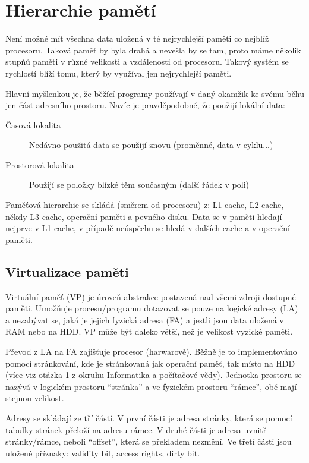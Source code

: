 \documentclass[10pt,a4paper,openright]{article}
\begin{document}
\section{Hierarchie pamětí}
Není možné mít všechna data uložená v té nejrychlejší paměti co nejblíž procesoru. Taková paměť by byla drahá a nevešla by se tam, proto máme několik stupňů paměti v různé velikosti a vzdálenosti od procesoru. Takový systém se rychlostí blíží tomu, který by využíval jen nejrychlejší paměti.

Hlavní myšlenkou je, že běžící programy používají v daný okamžik ke svému běhu jen část adresního prostoru. Navíc je pravděpodobné, že použijí lokální data: 

\begin{description}
\item[Časová lokalita] Nedávno použitá data se použijí znovu (proměnné, data v cyklu...)
\item[Prostorová lokalita] Použijí se položky blízké těm současným (další řádek v poli)
\end{description}

Paměťová hierarchie se skládá (směrem od procesoru) z: L1 cache, L2 cache, někdy L3 cache, operační paměti a pevného disku. Data se v paměti hledají nejprve v L1 cache, v případě neúspěchu se hledá v dalších cache a v operační paměti.

\subsection{Virtualizace paměti}
Virtuální paměť (VP) je úroveň abstrakce postavená nad všemi zdroji dostupné paměti. Umožňuje procesu/programu dotazovat se pouze na logické adresy (LA) a nezabývat se, jaká je jejich fyzická adresa (FA) a jestli jsou data uložená v RAM nebo na HDD. VP může být daleko větší, než je velikost vyzické paměti.

Převod z LA na FA zajišťuje procesor (harwarově). Běžně je to implementováno pomocí stránkování, kde je stránkovaná jak operační paměť, tak místo na HDD (více viz otázka 1 z okruhu Informatika a počítačové vědy). Jednotka prostoru se nazývá v logickém prostoru ``stránka'' a ve fyzickém prostoru ``rámec'', obě mají stejnou velikost.

Adresy se skládají ze tří částí. V první části je adresa stránky, která se pomocí tabulky stránek přeloží na adresu rámce. V druhé části je adresa uvnitř stránky/rámce, neboli ``offset'', která se překladem nezmění. Ve třetí části jsou uložené příznaky: validity bit, access rights, dirty bit.
\end{document}
